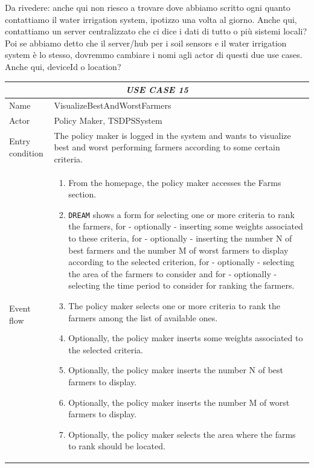 \documentclass{article}
\begin{document}
\color{red}
Da rivedere: anche qui non riesco a trovare dove abbiamo scritto ogni quanto contattiamo il water irrigation system, ipotizzo una volta al giorno. Anche qui, contattiamo un server centralizzato che ci dice i dati di tutto o più sistemi locali? Poi se abbiamo detto che il server/hub per i soil sensors e il water irrigation system è lo stesso, dovremmo cambiare i nomi agli actor di questi due use cases. Anche qui, deviceId o location?
\color{black}


\centering
\begin{longtable}{|p{3.5cm}|m{8cm}|}
 \hline
 \multicolumn{2}{|c|}{\cellcolor{white}\emph{USE CASE 15}} \\
 \endfirsthead
 \endhead
 \endfoot
 \endlastfoot
 \hline
 Name & VisualizeBestAndWorstFarmers\\
 \hline
 Actor & Policy Maker, TSDPSSystem\\
 \hline
 Entry condition & The policy maker is logged in the system and wants to visualize best and worst performing farmers according to some certain criteria.\\
 \hline
 Event flow & \begin{enumerate}
    \item From the homepage, the policy maker accesses the Farms section.
    \item \verb|DREAM| shows a form for selecting one or more criteria to rank the farmers, for - optionally - inserting some weights associated to these criteria, for - optionally - inserting the number N of best farmers and the number M of worst farmers to display according to the selected criterion,  for - optionally - selecting the area of the farmers to consider and for - optionally - selecting the time period to consider for ranking the farmers.
    \item The policy maker selects one or more criteria to rank the farmers among the list of available ones.
    \item Optionally, the policy maker inserts some weights associated to the selected criteria.
    \item Optionally, the policy maker inserts the number N of best farmers to display.
    \item Optionally, the policy maker inserts the number M of worst farmers to display.
    \item Optionally, the policy maker selects the area where the farms to rank should be located.

\end{enumerate}
\end{longtable}
\end{document}

